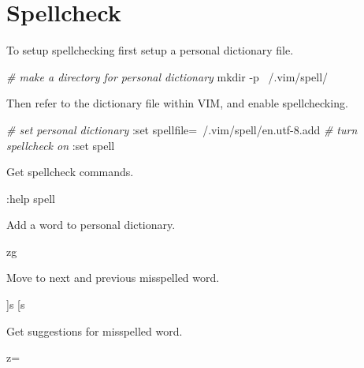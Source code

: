 \documentclass[]{book}
\newenvironment{Shaded}{\begin{snugshade}}{\end{snugshade}}
\newcommand{\CommentTok}[1]{\textcolor[rgb]{0.56,0.35,0.01}{\textit{#1}}}
\newcommand{\FunctionTok}[1]{\textcolor[rgb]{0.00,0.00,0.00}{#1}}
\newcommand{\VariableTok}[1]{\textcolor[rgb]{0.00,0.00,0.00}{#1}}
\newcommand{\ExtensionTok}[1]{#1}
\newcommand{\NormalTok}[1]{#1}
\begin{document}
\section{Spellcheck}\label{spellcheck}

To setup spellchecking first setup a personal dictionary file.

\begin{Shaded}
\begin{Highlighting}[]
\CommentTok{# make a directory for personal dictionary}
\FunctionTok{mkdir}\NormalTok{ -p ~/.vim/spell/}
\end{Highlighting}
\end{Shaded}

Then refer to the dictionary file within VIM, and enable spellchecking.

\begin{Shaded}
\begin{Highlighting}[]
\CommentTok{# set personal dictionary}
\NormalTok{:}\ExtensionTok{set}\NormalTok{ spellfile=~/.vim/spell/en.utf-8.add}
\CommentTok{# turn spellcheck on}
\NormalTok{:}\ExtensionTok{set}\NormalTok{ spell}
\end{Highlighting}
\end{Shaded}

Get spellcheck commands.

\begin{Shaded}
\begin{Highlighting}[]
\NormalTok{:}\ExtensionTok{help}\NormalTok{ spell}
\end{Highlighting}
\end{Shaded}

Add a word to personal dictionary.

\begin{Shaded}
\begin{Highlighting}[]
\ExtensionTok{zg}
\end{Highlighting}
\end{Shaded}

Move to next and previous misspelled word.

\begin{Shaded}
\begin{Highlighting}[]
\NormalTok{]}\ExtensionTok{s}
\NormalTok{[}\ExtensionTok{s}
\end{Highlighting}
\end{Shaded}

Get suggestions for misspelled word.

\begin{Shaded}
\begin{Highlighting}[]
\VariableTok{z=}
\end{Highlighting}
\end{Shaded}
\end{document}
